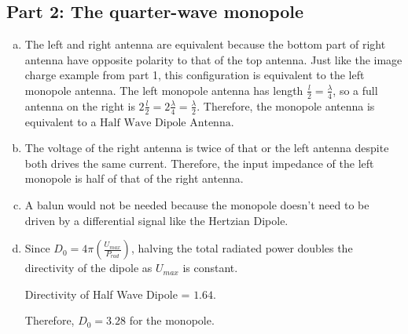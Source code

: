 \documentclass{article} %
\begin{document}
\subsection*{Part 2: The quarter-wave monopole}
\begin{enumerate}[(a)]
      \item The left and right antenna are equivalent because the bottom part of right antenna have opposite polarity to that of the top antenna. Just like the image charge example from part 1, this configuration is equivalent to the left monopole antenna.
            The left monopole antenna has length $\frac{l}{2} = \frac{\lambda}{4}$, so a full antenna on the right is $2\frac{l}{2} = 2\frac{\lambda}{4} = \frac{\lambda}{2}$. Therefore, the monopole antenna is equivalent to a $\boxed{\text{Half Wave Dipole Antenna}}$.
      \item The voltage of the right antenna is twice of that or the left antenna despite both drives the same current. Therefore, the input impedance of the left monopole is half of that of the right antenna.
      \item A balun would not be needed because the monopole doesn't need to be driven by a differential signal like the Hertzian Dipole.
      \item Since $D_0 = 4\pi \left(\frac{U_{max}}{P_{rad}}\right)$, halving the total radiated power doubles the directivity of the dipole as $U_{max}$ is constant.

            Directivity of Half Wave Dipole = $1.64$.

            Therefore, $\boxed{D_0 = 3.28}$ for the monopole.
\end{enumerate}
\end{document}
